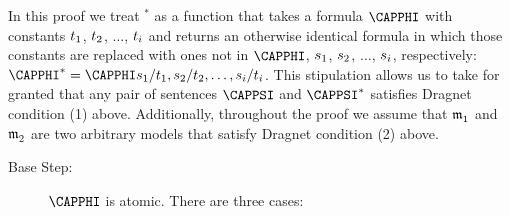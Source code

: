 \begin{PROOF}

\begin{commentary}
In this proof we treat $^*$ as a function that takes a \GQL{} formula $\CAPPHI$ with constants $t_1$, $t_2$, $\ldots$, $t_{i}$ and returns an otherwise identical formula in which those constants are replaced with ones not in $\CAPPHI$, $s_1$, $s_2$, $\ldots$, $s_{i}$, respectively: $\CAPPHI^*=\CAPPHI\variable{s}_1/\variable{t}_1,\variable{s}_2/\variable{t}_2,\ldots,\variable{s}_{\integer{i}}/\variable{t}_{\integer{i}}$.
This stipulation allows us to take for granted that any pair of sentences $\CAPPSI$ and $\CAPPSI^*$ satisfies Dragnet condition (1) above. 
Additionally, throughout the proof we assume that $\mathfrak{m^{\mathrm{}}_{\mathrm{1}}}$ and $\mathfrak{m^{\mathrm{}}_{\mathrm{2}}}$ are two arbitrary models that satisfy Dragnet condition (2) above.
\end{commentary}

\begin{description}
\item[Base Step:] $\CAPPHI$ is atomic. There are three cases:
\end{description}
\end{PROOF}
